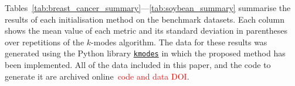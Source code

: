 Tables~\ref{tab:breast_cancer_summary}---\ref{tab:soybean_summary} summarise the
results of each initialisation method on the benchmark datasets. Each column
shows the mean value of each metric and its standard deviation in parentheses
over repetitions of the \(k\)-modes algorithm. The
data for these results was generated using the Python library
\href{https://github.com/nicodv/kmodes}{\texttt{kmodes}} in which the proposed
method has been implemented. All of the data included in this paper, and the
code to generate it are archived online~\textcolor{red}{code and data DOI}.

\begin{table}
    \centering
    \resizebox{\textwidth}{!}{%
        
    }
    \label{tab:breast_cancer_summary}\vspace{20pt}

    \resizebox{\textwidth}{!}{%
        
    }
    \label{tab:mushroom_summary}\vspace{20pt}

    \resizebox{\textwidth}{!}{%
        
    }
    \label{tab:nursery_summary}\vspace{20pt}

    \resizebox{\textwidth}{!}{%
        
    }
    \label{tab:soybean_summary}
\end{table}

